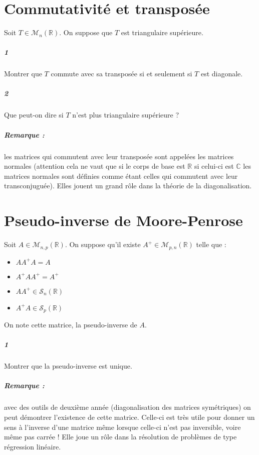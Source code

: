 \documentclass[10pt,a4paper]{article}
\begin{document}
\section{Commutativité et transposée}
Soit $T \in \mathcal{M}_n \left( \mathbb{R} \right)$. On suppose que $T$ est triangulaire supérieure. 
\subparagraph{1}Montrer que $T$ commute avec sa transposée si et seulement si $T$ est diagonale.
\subparagraph{2}Que peut-on dire si $T$ n'est plus triangulaire supérieure ?

\subparagraph{Remarque : } les matrices qui commutent avec leur transposée sont appelées les matrices normales (attention cela ne vaut que si le corps de base est $\mathbb{R}$ si celui-ci est $\mathbb{C}$ les matrices normales sont définies comme étant celles qui commutent avec leur transconjuguée). Elles jouent un grand rôle dans la théorie de la diagonalisation.

\section{Pseudo-inverse de Moore-Penrose}
Soit $A \in \mathcal{M}_{n,p} \left( \mathbb{R} \right)$. On suppose qu'il existe $A^+ \in \mathcal{M}_{p,n} \left( \mathbb{R} \right)$ telle que :
\begin{itemize}
\item $AA^+A=A$
\item $A^+AA^+=A^+$
\item $AA^+ \in \mathcal{S}_n \left( \mathbb{R} \right)$
\item $A^+A \in \mathcal{S}_p \left( \mathbb{R} \right)$
\end{itemize}
On note cette matrice, la pseudo-inverse de $A$.
\subparagraph{1}Montrer que la pseudo-inverse est unique.
\subparagraph{Remarque :} avec des outils de deuxième année (diagonalisation des matrices symétriques) on peut démontrer l'existence de cette matrice. Celle-ci est très utile pour donner un sens à l'inverse d'une matrice même lorsque celle-ci n'est pas inversible, voire même pas carrée ! Elle joue un rôle dans la résolution de problèmes de type régression linéaire.
\end{document}
